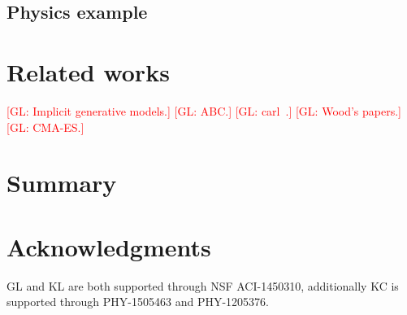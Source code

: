 \documentclass[twocolumn,superscriptaddress,aps]{revtex4-1}
\newcommand{\glnote}[1]{\textcolor{red}{[GL: #1]}}
\theoremstyle{plain}
\begin{document}
\subsection{Physics example}



\section{Related works}


\glnote{Implicit generative models.}
\glnote{ABC.}
\glnote{carl~\citep{cranmer2015approximating}.}
\glnote{Wood's papers.}
\glnote{CMA-ES.}



\section{Summary}




\section*{Acknowledgments}

GL and KL are both supported through NSF ACI-1450310, additionally KC is
supported through PHY-1505463 and PHY-1205376.





\end{document}
